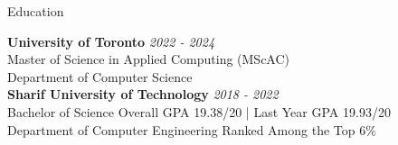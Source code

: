 \documentclass{resume} %
\begin{document}

\begin{rSection}{Education}

{\bf University of Toronto} \hfill \textcolor{Black!70}{\em 2022 - 2024} 
\\ Master of Science in Applied Computing (MScAC)
\\ Department of Computer Science
\\

{\bf Sharif University of Technology} \hfill \textcolor{Black!70}{\em 2018 - 2022} 
\\ Bachelor of Science \hfill \textcolor{Black!70}{ Overall GPA 19.38/20 | Last Year GPA 19.93/20}
\\ Department of Computer Engineering \hfill \textcolor{Black!70}{Ranked Among the Top 6\%}
\\



\end{rSection}
\end{document}
